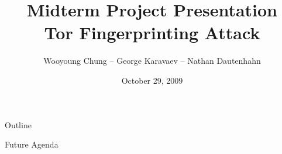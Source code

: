 \documentclass{beamer}
\title[Tor Fingerprinting Attack]{Midterm Project Presentation \\
Tor Fingerprinting Attack}
\author{Wooyoung Chung -- George Karavaev -- Nathan Dautenhahn}
\institute{Computer Security II \\ University of Illinois}
\date{October 29, 2009}
\begin{document}
\begin{frame}
\titelpage
\end{frame}


\begin{frame}{Outline}
\begin{itemize}

\end{itemize}

\end{frame}


\begin{frame}{Future Agenda}

\end{frame}
\end{document}

